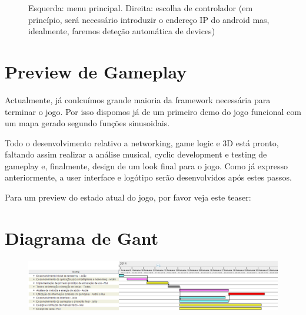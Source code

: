 \documentclass{article}
\begin{document}
\begin{figure}[H]
\caption{Esquerda: menu principal. Direita: escolha de controlador (em princípio, será necessário introduzir o endereço IP do android mas, idealmente, faremos deteção automática de devices)}
\end{figure}

\section{Preview de Gameplay}
Actualmente, já conlcuímos grande maioria da framework necessária para terminar o jogo. Por isso dispomos já de um primeiro demo do jogo funcional com um mapa gerado segundo funções sinusoidais.

Todo o desenvolvimento relativo a networking, game logic e 3D está pronto, faltando assim realizar a análise musical, cyclic development e testing de gameplay e, finalmente, design de um look final para o jogo. Como já expresso anteriormente, a user interface e logótipo serão desenvolvidos após estes passos.

Para um preview do estado atual do jogo, por favor veja este teaser: 

\section{Diagrama de Gant}
\begin{figure}[H]
\includegraphics[scale=0.6]{DiagramaGantt.png}
\end{figure}
\end{document}

